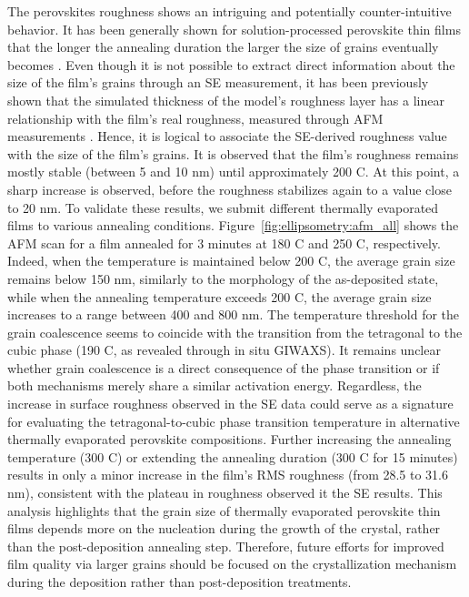 The perovskites roughness shows an intriguing and potentially counter-intuitive behavior. It has been generally shown for solution-processed perovskite thin films that the longer the annealing duration the larger the size of grains eventually becomes \cite{Lee2019MicrostructuralCell}. Even though it is not possible to extract direct information about the size of the film's grains through an SE measurement, it has been previously shown that the simulated thickness of the model's roughness layer has a linear relationship with the film's real roughness, measured through AFM measurements \cite{Fujiwara2000AssessmentFilms}. Hence, it is logical to associate the SE-derived roughness value with the size of the film's grains. It is observed that the film's roughness remains mostly stable (between 5 and 10 nm) until approximately 200 \degree C. At this point, a sharp increase is observed, before the roughness stabilizes again to a value close to 20 nm. To validate these results, we submit different thermally evaporated  films to various annealing conditions. Figure~\ref{fig:ellipsometry:afm_all} shows the AFM scan for a film annealed for 3 minutes at 180 \degree C and 250 \degree C, respectively. Indeed, when the temperature is maintained below 200 \degree C, the average grain size remains below 150 nm, similarly to the morphology of the as-deposited state, while when the annealing temperature exceeds 200 \degree C, the average grain size increases to a range between 400 and 800 nm. The temperature threshold for the grain coalescence seems to coincide with the transition from the tetragonal to the cubic phase (190 \degree C, as revealed through in situ GIWAXS). It remains unclear whether grain coalescence is a direct consequence of the phase transition or if both mechanisms merely share a similar activation energy. Regardless, the increase in surface roughness observed in the SE data could serve as a signature for evaluating the tetragonal-to-cubic phase transition temperature in alternative thermally evaporated perovskite compositions. Further increasing the annealing temperature (300 \degree C) or extending the annealing duration (300 \degree C for 15 minutes) results in only a minor increase in the film's RMS roughness (from 28.5 to 31.6 nm), consistent with the plateau in roughness observed it the SE results. This analysis highlights that the grain size of thermally evaporated perovskite thin films depends more on the nucleation during the growth of the crystal, rather than the post-deposition annealing step. Therefore, future efforts for improved film quality via larger grains should be focused on the crystallization mechanism during the deposition rather than post-deposition treatments. 


